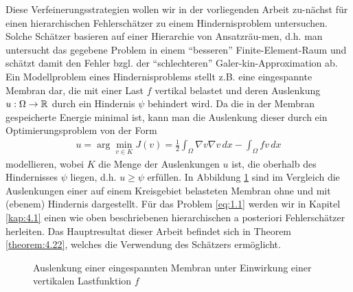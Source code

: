 Diese Verfeinerungsstrategien wollen wir in der vorliegenden Arbeit zu-nächst für einen hierarchischen Fehlerschätzer zu einem Hindernisproblem untersuchen. Solche Schätzer basieren auf einer Hierarchie von Ansatzräu-men, d.h. man untersucht das gegebene Problem in einem "`besseren"' Finite-Element-Raum und schätzt damit den Fehler bzgl. der "`schlechteren"' Galer-kin-Approximation ab. Ein Modellproblem eines Hindernisproblems stellt z.B. eine eingespannte Membran dar, die mit einer Last $f$ vertikal belastet und deren Auslenkung $u: \Omega \rightarrow \mathbb{R}$ durch ein Hindernis $\psi$ behindert wird. Da die in der Membran gespeicherte Energie minimal ist, kann man die Auslenkung dieser durch ein Optimierungsproblem von der Form
\begin{align}\label{eq:1.1}
	u = \arg\min_{v \in K} J(v) = \frac 12 \int_{\Omega} \nabla v \nabla v \, dx - \int_\Omega f v \, dx
\end{align}
modellieren, wobei $K$ die Menge der Auslenkungen $u$ ist, die oberhalb des Hindernisses $\psi$ liegen, d.h. $u\ge \psi$ erfüllen.  In Abbildung \ref{abb:1.1} sind im Vergleich die Auslenkungen einer auf einem Kreisgebiet belasteten Membran ohne und mit (ebenem) Hindernis dargestellt. Für das Problem \eqref{eq:1.1} werden wir in Kapitel \ref{kap:4.1} einen wie oben beschriebenen hierarchischen a posteriori Fehlerschätzer herleiten. Das Hauptresultat dieser Arbeit befindet sich in Theorem \ref{theorem:4.22}, welches  die Verwendung des Schätzers ermöglicht.

\begin{figure}[h]
\begin{center}
\hfill
{}
\end{center}
\caption{Auslenkung einer eingespannten Membran unter Einwirkung einer vertikalen Lastfunktion $f$\label{abb:1.1}}
\end{figure}


